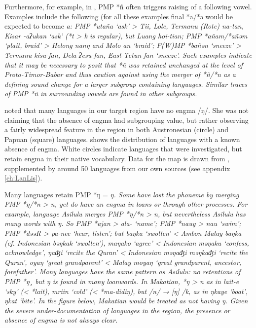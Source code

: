 Furthermore, for example, in ,
PMP *ñ often triggers raising of a following vowel.
Examples include the following (for all these examples final
*a/*ə would be expected to become \it{a}: PMP *utaña ‘ask’ >
Tii, Lole, Termanu (Rote) \it{na-tan}, Kisar \it{-aʔukan}
‘ask’ (*t > \it{k} is regular),
but Luang \it{hoi-tian}; PMP *añam/*añəm ‘plait,
braid’ > Helong \it{nanŋ}
and Molo \it{an} ‘braid’; P(W)MP *bañən ‘sneeze’ > Termanu
\it{kisu-fan}, Dela \it{ʔesu-fan}, East Tetun \it{fan} ‘sneeze’.
Such examples indicate that it may be necessary to posit that
*ñ was retained unchanged at the level of Proto-Timor-Babar
and thus caution against using the merger of *ñ/*n as a defining
sound change for a larger subgroup containing  languages.
Similar traces of PMP *ñ in surrounding vowels are found in other subgroups.

\citet{Schapper2015} noted that many languages in our target
region have no engma /ŋ/.
She was not claiming that the absence of engma had subgrouping
value, but rather observing a fairly widespread feature in the region
in both Austronesian (circle)
and Papuan (square) languages.
 shows the distribution of languages with a known absence of engma.
White circles indicate languages that were investigated,
but retain engma in their native vocabulary.
Data for the map is drawn from \citet{DonohueDawson2013},
supplemented by around 50 languages from our own sources (see appendix \ref{ch:LanLis}).

Many languages retain PMP *ŋ = \it{ŋ}.
Some have lost the phoneme by merging PMP *ŋ/*n > \it{n},
yet do have an engma in loans or through other processes.
For example,  language Asilulu merges PMP *ŋ/*n
> \it{n}, but nevertheless Asilulu has many words with \it{ŋ}.
So PMP *ajan > \it{ala-} ‘name’; PMP *nauy >
\it{nau} ‘swim’; PMP *dəəR > \it{pa-nee}
‘hear, listen’; but \it{baŋka} ‘swollen’ < Ambon Malay \it{baŋka} (cf.
Indonesian \it{bəŋkak} ‘swollen’), \it{maŋako} ‘agree’ < Indonesian
\it{məŋaku} ‘confess, acknowledge’, \it{ŋaʤi} ‘recite the Quran’ < Indonesian \it{məŋaʤi
{\tl} məŋkaʤi} ‘recite the Quran’,
\it{oyaŋ} ‘great grandparent’ < Malay \it{moyaŋ} ‘great grandparent, ancestor, forefather’.
Many  languages have the same pattern as Asilulu:
no retentions of PMP *ŋ¸ but \it{ŋ} is found in many loanwords.
In Makatian, *ŋ > \it{n} as in \it{lait-e} ‘sky’ (< *lait),
\it{mriin} ‘cold’ (< *\it{ma-didiŋ}),
but /n/ → [ŋ] /{\gap}k,
as in \it{ŋkaye} ‘boat’, \it{ŋkat} ‘bite’.
In the figure below,
Makatian would be treated as not having \it{ŋ}.
Given the severe under-documentation of languages in the region,
the presence or absence of engma is not always clear.

